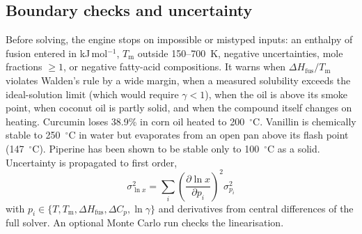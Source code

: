 \documentclass[journal=jceaax,manuscript=article,layout=twocolumn]{achemso}
\begin{document}
\subsection{Boundary checks and uncertainty}
Before solving, the engine stops on impossible or mistyped inputs: an enthalpy of fusion entered in kJ\,mol$^{-1}$, $T_\mathrm{m}$ outside 150--700~K, negative uncertainties, mole fractions $\ge1$, or negative fatty-acid compositions. It warns when $\Delta H_\mathrm{fus}/T_\mathrm{m}$ violates Walden's rule by a wide margin, when a measured solubility exceeds the ideal-solution limit (which would require $\gamma<1$), when the oil is above its smoke point,\cite{smokepoint} when coconut oil is partly solid, and when the compound itself changes on heating. Curcumin loses 38.9\% in corn oil heated to 200~$^\circ$C.\cite{siddiqui2015} Vanillin is chemically stable to 250~$^\circ$C in water\cite{doctor2020} but evaporates from an open pan above its flash point (147~$^\circ$C). Piperine has been shown to be stable only to 100~$^\circ$C as a solid.\cite{kotte2014} Uncertainty is propagated to first order,\cite{jcgm2008}
\begin{equation}
\sigma_{\ln x}^2=\sum_i\left(\frac{\partial\ln x}{\partial p_i}\right)^2\sigma_{p_i}^2
\end{equation}
with $p_i\in\{T,T_\mathrm{m},\Delta H_\mathrm{fus},\Delta C_p,\ln\gamma\}$ and derivatives from central differences of the full solver. An optional Monte Carlo run checks the linearisation.
\end{document}
